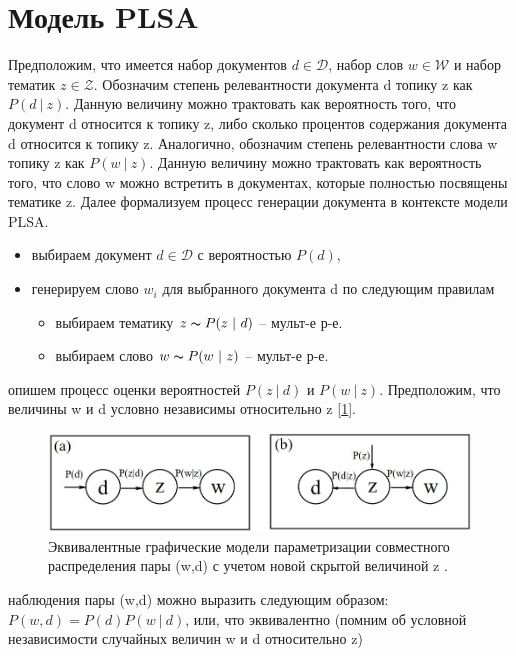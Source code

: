 \documentclass[aps,%
12pt,%
final,%
oneside,
onecolumn,%
musixtex, %
superscriptaddress,%
centertags]{article} %
\begin{document}
\section*{Модель PLSA}
\hspace{0.4cm}
Предположим, что имеется набор документов $d \in \mathcal{D}$, набор слов $w \in \mathcal{W}$ и набор тематик $z \in \mathcal{Z}$. Обозначим степень релевантности документа d топику z как $P(d\ |\ z)$. Данную величину можно трактовать как вероятность того, что документ d относится к топику z, либо сколько процентов содержания документа d относится к топику z. Аналогично, обозначим степень релевантности слова w топику z как $P(w\ |\ z)$. Данную величину можно трактовать как вероятность того, что слово w можно встретить в документах, которые полностью посвящены тематике z. Далее формализуем процесс генерации документа в контексте модели PLSA.\par
\begin{itemize}
\item выбираем документ $d \in \mathcal{D}$ с вероятностью $P(d)$,
\item генерируем слово $w_i$ для выбранного документа d по следующим правилам
    \begin{itemize} 
        \item выбираем тематику $z \thicksim P(z\ |\ d)$ – мульт-е р-е.
        \item выбираем слово $w \thicksim P(w\ |\ z)$ – мульт-е р-е.
     \end{itemize}
\end{itemize}
 опишем процесс оценки вероятностей $P(z\ |\ d)$ и $P(w\ |\ z)$. Предположим, что величины w и d условно независимы  относительно z [\ref{fig:plsa}].
\begin{figure}[h!]
  \includegraphics[width=\linewidth]{PLSA_graph.jpg}
  \caption{Эквивалентные графические модели параметризации совместного распределения пары  (w,d) с учетом новой скрытой величиной z \cite{hoffman1}.}
  \label{fig:plsa}
\end{figure}
 наблюдения пары (w,d) можно выразить следующим образом: $P(w, d)=P(d)P(w\ |\ d)$, или, что эквивалентно (помним об условной независимости случайных величин w и d относительно z)
\end{document}
